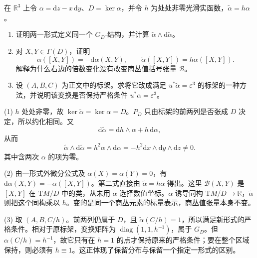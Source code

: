 \begin{exercise}
	\label{g1:ex:contact-form-scaling-intrinsic}
	在 \(\mathbb R^3\) 上令 \(\alpha=\mathrm{d}z-x\,\mathrm{d}y\)、\(D=\ker\alpha\)，并令 \(h\) 为处处非零光滑实函数，\(\widetilde\alpha=h\alpha\)。
	\begin{enumerate}
		\item 证明两一形式定义同一个 \(G_D\)-结构，并计算 \(\widetilde\alpha\wedge\mathrm{d}\widetilde\alpha\)。
		\item 对 \(X,Y\in\Gamma(D)\)，证明
		\[
			\alpha([X,Y])=-\mathrm{d}\alpha(X,Y),\qquad
			\widetilde\alpha([X,Y])=h\alpha([X,Y]).
		\]
		解释为什么右边的倍数变化没有改变商丛值括号张量 \(\mathcal B\)。
		\item 设 \((A,B,C)\) 为正文中的标架。求将它改成满足 \(u^*\widetilde\alpha=\varepsilon^3\) 的标架的一种方法，并说明该变换是否保持严格条件 \(u^*\alpha=\varepsilon^3\)。
	\end{enumerate}
\end{exercise}
\begin{solution}
	(1) \(h\) 处处非零，故 \(\ker\widetilde\alpha=\ker\alpha=D\)。\(P_D\) 只由标架的前两列是否张成 \(D\) 决定，所以约化相同。又
	\[
		\mathrm{d}\widetilde\alpha=\mathrm{d}h\wedge\alpha+h\,\mathrm{d}\alpha,
	\]
	从而
	\[
		\widetilde\alpha\wedge\mathrm{d}\widetilde\alpha
		=h^2\alpha\wedge\mathrm{d}\alpha
		=-h^2\mathrm{d}x\wedge\mathrm{d}y\wedge\mathrm{d}z\neq0.
	\]
	其中含两次 \(\alpha\) 的项为零。

	(2) 由一形式外微分公式及 \(\alpha(X)=\alpha(Y)=0\)，有 \(\mathrm{d}\alpha(X,Y)=-\alpha([X,Y])\)。第二式直接由 \(\widetilde\alpha=h\alpha\) 得出。这里 \(\mathcal B(X,Y)\) 是 \([X,Y]\) 在 \(\mathrm{T}M/D\) 中的类，从未用 \(\alpha\) 选择数值坐标。\(\alpha\) 诱导同构 \(\mathrm{T}M/D\to\mathbb R\)，\(\widetilde\alpha\) 则把这个同构乘以 \(h\)。变的是同一个商丛元素的标量表示，商丛值张量本身不变。

	(3) 取 \((A,B,C/h)\)。前两列仍属于 \(D\)，且 \(\widetilde\alpha(C/h)=1\)，所以满足新形式的严格条件。相对于原标架，变换矩阵为 \(\operatorname{diag}(1,1,h^{-1})\)，属于 \(G_D\)。但 \(\alpha(C/h)=h^{-1}\)，故它只有在 \(h=1\) 的点才保持原来的严格条件；要在整个区域保持，则必须有 \(h\equiv1\)。这正体现了保留分布与保留一个指定一形式的区别。
\end{solution}


